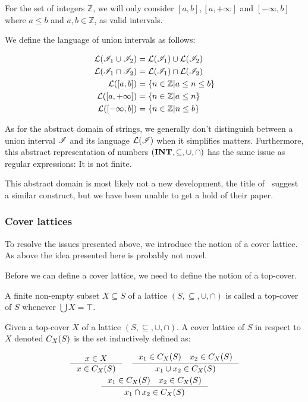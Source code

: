 For the set of integers $\mathbb{Z}$, we will only consider $[a, b], [a, +\infty]$ and $[-\infty, b]$ where $a \leq b$ and $a, b \in \mathbb{Z}$, as valid intervals.

We define the language of union intervals as follows:


\begin{align}
    \mathcal{L}(\mathscr{I}_1 \cup \mathscr{I}_2) &= \mathcal{L}(\mathscr{I}_1) \cup \mathcal{L}(\mathscr{I}_2) \\
    \mathcal{L}(\mathscr{I}_1 \cap \mathscr{I}_2) &= \mathcal{L}(\mathscr{I}_1) \cap \mathcal{L}(\mathscr{I}_2) \\
    \mathcal{L}([a, b]) &= \left\{ n \in \mathbb{Z} \middle| a \leq n \leq b \right\} \\
    \mathcal{L}([a, +\infty]) &= \left\{ n \in \mathbb{Z} \middle| a \leq n \right\} \\
    \mathcal{L}([-\infty, b]) &= \left\{ n \in \mathbb{Z} \middle| n \leq b \right\}
\end{align}


As for the abstract domain of strings, we generally don't distinguish between a union interval $\mathscr{I}$ and its language $\mathcal{L}(\mathscr{I})$ when it simplifies matters.
Furthermore, this abstract representation of numbers $(\mathbf{INT}, \subseteq, \cup, \cap)$ has the same issue as regular expressions: It is not finite.

This abstract domain is most likely not a new development, the title of~\cite{li2010abstract} suggest a similar construct, but we have been unable to get a hold of their paper.

\subsubsection{Cover lattices}\label{subsubsec:cover-lattice}
To resolve the issues presented above, we introduce the notion of a cover lattice.
As above the idea presented here is probably not novel.

Before we can define a cover lattice, we need to define the notion of a top-cover.

\begin{definition}
    A finite non-empty subset $X \subseteq S$ of a lattice $(S, \subseteq, \cup, \cap)$ is called a top-cover of $S$ whenever $\bigcup X = \top$.
\end{definition}

\begin{definition}\label{def:coverlattice}
Given a top-cover $X$ of a lattice $(S, \subseteq, \cup, \cap)$.
A cover lattice of $S$ in respect to $X$ denoted $C_{X}(S)$ is the set inductively defined as:

\begin{gather*}
    \inference{x \in X}{x \in C_X(S)} \quad
    \inference{x_1 \in C_X(S) \quad x_2 \in C_X(S)}{x_1 \cup  x_2 \in C_X(S)}\\
    \inference{x_1 \in C_X(S) \quad x_2 \in C_X(S)}{x_1 \cap  x_2 \in C_X(S)}
\end{gather*}
\end{definition}

